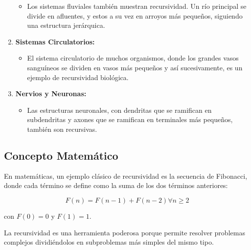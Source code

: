 \begin{enumerate}
\begin{itemize}
  \item
    Los sistemas fluviales también muestran recursividad. Un río
    principal se divide en afluentes, y estos a su vez en arroyos más
    pequeños, siguiendo una estructura jerárquica.
  \end{itemize}
\item
  \textbf{Sistemas Circulatorios:}

  \begin{itemize}
  
  \item
    El sistema circulatorio de muchos organismos, donde los grandes
    vasos sanguíneos se dividen en vasos más pequeños y así
    sucesivamente, es un ejemplo de recursividad biológica.
  \end{itemize}
\item
  \textbf{Nervios y Neuronas:}

  \begin{itemize}
  
  \item
    Las estructuras neuronales, con dendritas que se ramifican en
    subdendritas y axones que se ramifican en terminales más pequeños,
    también son recursivas.
  \end{itemize}
\end{enumerate}

\subsection{Concepto Matemático}

En matemáticas, un ejemplo clásico de recursividad es la secuencia de
Fibonacci, donde cada término se define como la suma de los dos términos
anteriores:

\[ F(n) = F(n-1) + F(n-2) \forall n\geq 2\]

con \(F(0) = 0\) y \(F(1) = 1\).

La recursividad es una herramienta poderosa porque permite resolver
problemas complejos dividiéndolos en subproblemas más simples del mismo
tipo.\\

